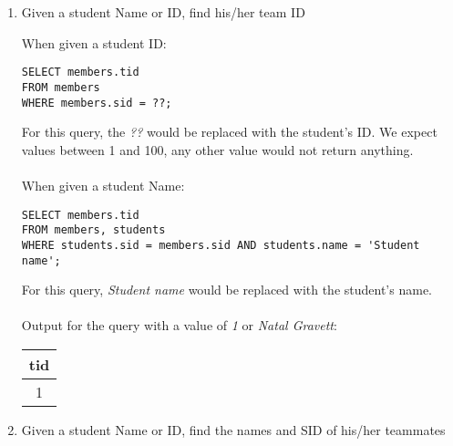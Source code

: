\documentclass[11pt,letterpaper]{article}
\begin{document}
\begin{enumerate}
\item Given a student Name or ID, find his/her team ID

When given a student ID:
\begin{verbatim}
SELECT members.tid 
FROM members 
WHERE members.sid = ??;
\end{verbatim}
For this query, the \textit{??} would be replaced with the student's ID. We expect values between 1 and 100, any other value would not return anything.\\
\\
When given a student Name:
\begin{verbatim}
SELECT members.tid 
FROM members, students 
WHERE students.sid = members.sid AND students.name = 'Student name';
\end{verbatim}
For this query, \textit{Student name} would be replaced with the student's name.\\
\\
Output for the query with a value of \textit{1} or \textit{Natal Gravett}:
\begin{center}
\begin{tabular}{ | c | }
 \hline
 tid \\
 \hline
1\\
 \hline
\end{tabular}
\end{center}

\item Given a student Name or ID, find the names and SID of his/her teammates


\end{enumerate}
\end{document}
